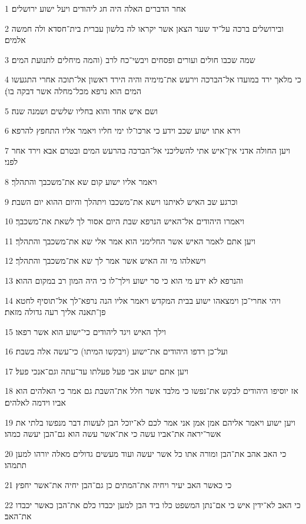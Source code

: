 \par 1 אחר הדברים האלה היה חג ליהודים ויעל ישוע ירושלים׃
\par 2 ובירושלים ברכה על־יד שער הצאן אשר יקראו לה בלשון עברית בית־חסדא ולה חמשה אלמים׃
\par 3 שמה שכבו חולים ועורים ופסחים ויבשי־כח לרב (והמה מיחלים לתנועת המים׃
\par 4 כי מלאך ירד במועדו אל־הברכה וירעש את־מימיה והיה הירד ראשון אל־תוכה אחרי התגעשו המים הוא נרפא מכל־מחלה אשר דבקה בו)׃
\par 5 ושם איש אחד והוא בחליו שלשים ושמנה שנה׃
\par 6 וירא אתו ישוע שכב וידע כי ארכו־לו ימי חליו ויאמר אליו התחפץ להרפא׃
\par 7 ויען החולה אדני אין־איש אתי להשליכני אל־הברכה בהרעש המים ובטרם אבא וירד אחר לפני׃
\par 8 ויאמר אליו ישוע קום שא את־משכבך והתהלך׃
\par 9 וכרגע שב האיש לאיתנו וישא את־משכבו ויתהלך והיום ההוא יום השבת׃
\par 10 ויאמרו היהודים אל־האיש הנרפא שבת היום אסור לך לשאת את־משכבך׃
\par 11 ויען אתם לאמר האיש אשר החלימני הוא אמר אלי שא את־משכבך והתהלך׃
\par 12 וישאלהו מי זה האיש אשר אמר לך שא את־משכבך והתהלך׃
\par 13 והנרפא לא ידע מי הוא כי סר ישוע וילך־לו כי היה המון רב במקום ההוא׃
\par 14 ויהי אחרי־כן וימצאהו ישוע בבית המקדש ויאמר אליו הנה נרפא־לך אל־תוסיף לחטא פן־תאנה אליך רעה גדולה מזאת׃
\par 15 וילך האיש ויגד ליהודים כי־ישוע הוא אשר רפאו׃
\par 16 ועל־כן רדפו היהודים את־ישוע (ויבקשו המיתו) כי־עשה אלה בשבת׃
\par 17 ויען אתם ישוע אבי פעל פעלתו עד־עתה וגם־אנכי פעל׃
\par 18 אז יוסיפו היהודים לבקש את־נפשו כי מלבד אשר חלל את־השבת גם אמר כי האלהים הוא אביו וידמה לאלהים׃
\par 19 ויען ישוע ויאמר אליהם אמן אמן אני אמר לכם לא־יוכל הבן לעשות דבר מנפשו בלתי את אשר־יראה את־אביו עשה כי את־אשר עשה הוא גם־הבן יעשה כמהו׃
\par 20 כי האב אהב את־הבן ומורה אתו כל אשר יעשה ועוד מעשים גדולים מאלה יורהו למען תתמהו׃
\par 21 כי כאשר האב יעיר ויחיה את־המתים כן גם־הבן יחיה את־אשר יחפץ׃
\par 22 כי האב לא־ידין איש כי אם־נתן המשפט כלו ביד הבן למען יכבדו כלם את־הבן כאשר יכבדו את־האב׃
